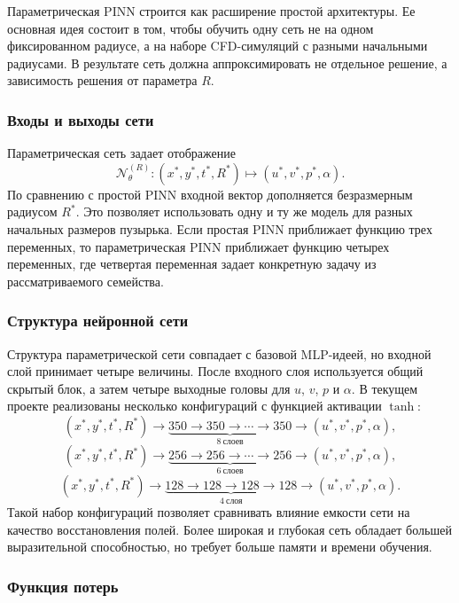 \documentclass[12pt,a4paper]{article}
\begin{document}
Параметрическая PINN строится как расширение простой архитектуры. Ее основная
идея состоит в том, чтобы обучить одну сеть не на одном фиксированном радиусе,
а на наборе CFD-симуляций с разными начальными радиусами. В результате сеть
должна аппроксимировать не отдельное решение, а зависимость решения от
параметра \(R\).

\subsubsection{Входы и выходы сети}

Параметрическая сеть задает отображение
\[
    \mathcal{N}_{\theta}^{(R)}:
    (x^*,y^*,t^*,R^*)\mapsto (u^*,v^*,p^*,\alpha).
\]
По сравнению с простой PINN входной вектор дополняется безразмерным радиусом
\(R^*\). Это позволяет использовать одну и ту же модель для разных начальных
размеров пузырька. Если простая PINN приближает функцию трех переменных, то
параметрическая PINN приближает функцию четырех переменных, где четвертая
переменная задает конкретную задачу из рассматриваемого семейства.

\subsubsection{Структура нейронной сети}

Структура параметрической сети совпадает с базовой MLP-идеей, но входной слой
принимает четыре величины. После входного слоя используется общий скрытый блок,
а затем четыре выходные головы для \(u\), \(v\), \(p\) и \(\alpha\). В текущем
проекте реализованы несколько конфигураций с функцией активации \(\tanh\):
\[
    (x^*,y^*,t^*,R^*) \rightarrow
    \underbrace{350 \rightarrow 350 \rightarrow \cdots \rightarrow 350}_{8\ \text{слоев}}
    \rightarrow
    (u^*,v^*,p^*,\alpha),
\]
\[
    (x^*,y^*,t^*,R^*) \rightarrow
    \underbrace{256 \rightarrow 256 \rightarrow \cdots \rightarrow 256}_{6\ \text{слоев}}
    \rightarrow
    (u^*,v^*,p^*,\alpha),
\]
\[
    (x^*,y^*,t^*,R^*) \rightarrow
    \underbrace{128 \rightarrow 128 \rightarrow 128 \rightarrow 128}_{4\ \text{слоя}}
    \rightarrow
    (u^*,v^*,p^*,\alpha).
\]
Такой набор конфигураций позволяет сравнивать влияние емкости сети на качество
восстановления полей. Более широкая и глубокая сеть обладает большей
выразительной способностью, но требует больше памяти и времени обучения.

\subsubsection{Функция потерь}
\end{document}
